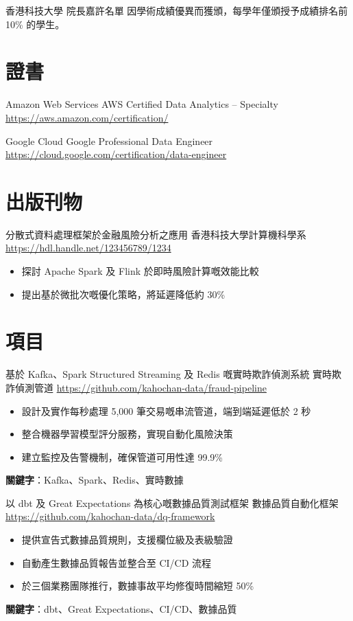 \documentclass[a4paper, serif, 10pt]{moderncv}
\begin{document}
        {香港科技大學}
        {院長嘉許名單}
        {}
        {}
        {因學術成績優異而獲頒，每學年僅頒授予成績排名前 10\% 的學生。}
\section{證書}

        {Amazon Web Services}
        {AWS Certified Data Analytics – Specialty}
        {\url{https://aws.amazon.com/certification/}}
        {}
        {}

        {Google Cloud}
        {Google Professional Data Engineer}
        {\url{https://cloud.google.com/certification/data-engineer}}
        {}
        {}
\section{出版刊物}

        {分散式資料處理框架於金融風險分析之應用}
        {香港科技大學計算機科學系}
        {\url{https://hdl.handle.net/123456789/1234}}
        {}
        {\begin{itemize}
\item 探討 Apache Spark 及 Flink 於即時風險計算嘅效能比較
\item 提出基於微批次嘅優化策略，將延遲降低約 30\%
\end{itemize}}
\section{項目}

        {基於 Kafka、Spark Structured Streaming 及 Redis 嘅實時欺詐偵測系統}
        {實時欺詐偵測管道}
        {\url{https://github.com/kahochan-data/fraud-pipeline}}
        {}
        {\begin{itemize}
\item 設計及實作每秒處理 5,000 筆交易嘅串流管道，端到端延遲低於 2 秒
\item 整合機器學習模型評分服務，實現自動化風險決策
\item 建立監控及告警機制，確保管道可用性達 99.9\%
\end{itemize}
\textbf{關鍵字}：Kafka、Spark、Redis、實時數據}

        {以 dbt 及 Great Expectations 為核心嘅數據品質測試框架}
        {數據品質自動化框架}
        {\url{https://github.com/kahochan-data/dq-framework}}
        {}
        {\begin{itemize}
\item 提供宣告式數據品質規則，支援欄位級及表級驗證
\item 自動產生數據品質報告並整合至 CI/CD 流程
\item 於三個業務團隊推行，數據事故平均修復時間縮短 50\%
\end{itemize}
\textbf{關鍵字}：dbt、Great Expectations、CI/CD、數據品質}
\end{document}

